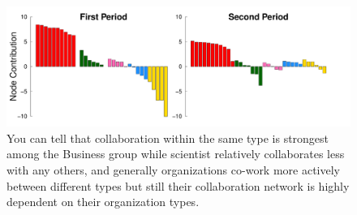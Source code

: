 \documentclass[12pt]{article}
\begin{document}
\begin{figure}[h]
	\centering
	\includegraphics[width=\linewidth]{../Figure/barplots_nolegend.pdf}	
	\caption{You can tell that collaboration within the same type is strongest among the Business group while scientist relatively collaborates less with any others, and generally organizations co-work more actively between different types but still their collaboration network is highly dependent on their organization types.}
	\label{fig:barplots}
\end{figure}
\end{document}
